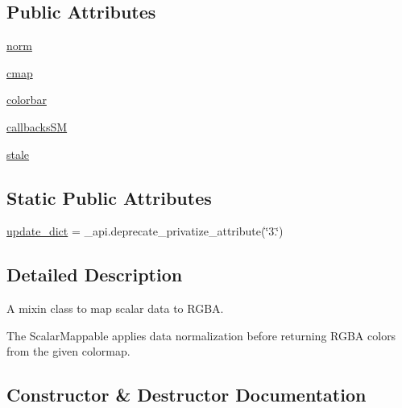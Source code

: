 \subsection*{Public Attributes}
\begin{DoxyCompactItemize}
\item 
\hyperlink{classmatplotlib_1_1cm_1_1ScalarMappable_a5507985e8c38feaa3d6972f75db09f73}{norm}
\item 
\hyperlink{classmatplotlib_1_1cm_1_1ScalarMappable_a3684ebc12a81cc6f2599c0babd1d40af}{cmap}
\item 
\hyperlink{classmatplotlib_1_1cm_1_1ScalarMappable_a5153949edc783718d04da55940c42186}{colorbar}
\item 
\hyperlink{classmatplotlib_1_1cm_1_1ScalarMappable_a8fd7de7a97ab3d0543d04e7cd5783fdf}{callbacks\+SM}
\item 
\hyperlink{classmatplotlib_1_1cm_1_1ScalarMappable_a7638f2b6c5b223b2b2392f0c66dbfed9}{stale}
\end{DoxyCompactItemize}
\subsection*{Static Public Attributes}
\begin{DoxyCompactItemize}
\item 
\hyperlink{classmatplotlib_1_1cm_1_1ScalarMappable_acf44aea1bf0a92af3091c51f47bf64fd}{update\+\_\+dict} = \+\_\+api.\+deprecate\+\_\+privatize\+\_\+attribute(\char`\"{}3.\char`\"{})
\end{DoxyCompactItemize}


\subsection{Detailed Description}
\begin{DoxyVerb}A mixin class to map scalar data to RGBA.

The ScalarMappable applies data normalization before returning RGBA colors
from the given colormap.
\end{DoxyVerb}
 

\subsection{Constructor \& Destructor Documentation}
\mbox{\label{classmatplotlib_1_1cm_1_1ScalarMappable_adaafbd301870bb267907a7f748a590ff}} 

